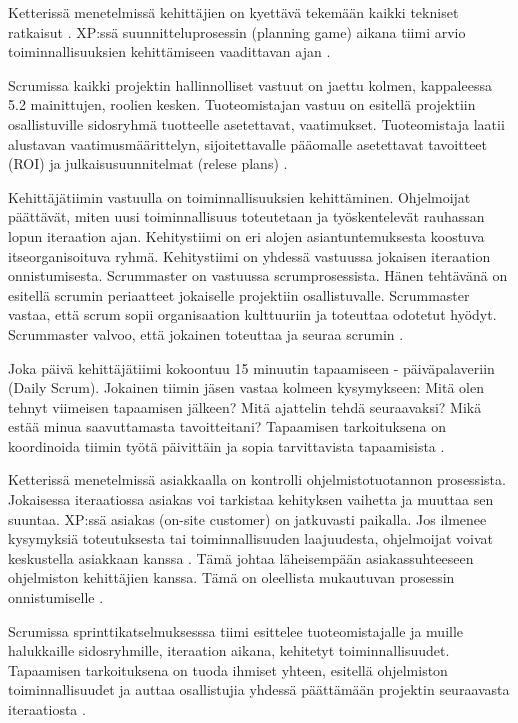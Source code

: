 \documentclass[finnish]{tktltiki2}
\theoremstyle{definition}
\theoremstyle{remark}
\begin{document}
{Ketterissä menetelmissä kehittäjien on kyettävä tekemään kaikki tekniset ratkaisut \cite{FOW01a}. XP:ssä suunnitteluprosessin (planning game) aikana tiimi arvio toiminnallisuuksien kehittämiseen vaadittavan ajan \cite{BEC99}.

Scrumissa kaikki projektin hallinnolliset vastuut on jaettu kolmen, kappaleessa 5.2 mainittujen, roolien kesken. Tuoteomistajan vastuu on esitellä projektiin osallistuville sidosryhmä tuotteelle asetettavat, vaatimukset. Tuoteomistaja laatii alustavan vaatimusmäärittelyn, sijoitettavalle pääomalle asetettavat tavoitteet (ROI) ja julkaisusuunnitelmat (relese plans) \cite{SCH09}.

Kehittäjätiimin vastuulla on toiminnallisuuksien kehittäminen. Ohjelmoijat päättävät, miten uusi toiminnallisuus toteutetaan ja työskentelevät rauhassan lopun iteraation ajan. Kehitystiimi on eri alojen asiantuntemuksesta koostuva itseorganisoituva ryhmä. Kehitystiimi on yhdessä vastuussa jokaisen iteraation onnistumisesta. Scrummaster on vastuussa scrumprosessista. Hänen tehtävänä on esitellä scrumin periaatteet jokaiselle projektiin osallistuvalle. Scrummaster vastaa, että scrum sopii organisaation kulttuuriin ja toteuttaa odotetut hyödyt. Scrummaster valvoo, että jokainen toteuttaa ja seuraa scrumin  \cite{SCH09}.

Joka päivä kehittäjätiimi kokoontuu 15 minuutin tapaamiseen - päiväpalaveriin (Daily Scrum). Jokainen tiimin jäsen vastaa kolmeen kysymykseen: Mitä olen tehnyt viimeisen tapaamisen jälkeen? Mitä ajattelin tehdä seuraavaksi? Mikä estää minua saavuttamasta tavoitteitani? Tapaamisen tarkoituksena on koordinoida tiimin työtä päivittäin ja sopia tarvittavista tapaamisista \cite{SCH09}.

Ketterissä menetelmissä asiakkaalla on kontrolli ohjelmistotuotannon prosessista. Jokaisessa iteraatiossa asiakas voi tarkistaa kehityksen vaihetta ja muuttaa sen suuntaa. XP:ssä asiakas (on-site customer) on jatkuvasti paikalla. Jos ilmenee kysymyksiä toteutuksesta tai toiminnallisuuden laajuudesta, ohjelmoijat voivat keskustella asiakkaan kanssa \cite{BEC99}. Tämä johtaa läheisempään asiakassuhteeseen ohjelmiston kehittäjien kanssa. Tämä on oleellista mukautuvan prosessin onnistumiselle \cite{FOW01a}.

Scrumissa sprinttikatselmuksesssa tiimi esittelee tuoteomistajalle ja muille halukkaille sidosryhmille, iteraation aikana, kehitetyt toiminnallisuudet. Tapaamisen tarkoituksena on tuoda ihmiset yhteen, esitellä ohjelmiston toiminnallisuudet ja auttaa osallistujia yhdessä päättämään projektin seuraavasta iteraatiosta \cite{SCH09}.

}
\end{document}
